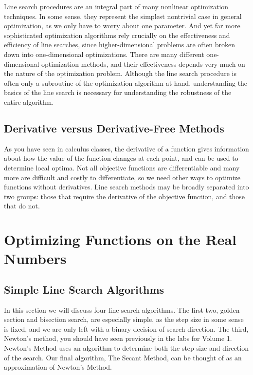 Line search procedures are an integral part of many nonlinear optimization techniques.
In some sense, they represent the simplest nontrivial case in general optimization, as
we only have to worry about one parameter. And yet far more sophisticated optimization
algorithms rely crucially on the effectiveness and efficiency of line searches, since
higher-dimensional problems are often broken down into one-dimensional optimizations.
There are many different one-dimensional optimization methods, and their effectiveness depends very much
on the nature of the optimization problem. Although the line search procedure is often
only a subroutine of the optimization algorithm at hand, understanding the basics of
the line search is necessary for understanding the robustness of the entire algorithm.

\subsection*{Derivative versus Derivative-Free Methods}
As you have seen in calculus classes, the derivative of a function gives information
about how the value of the function changes at each point, and can be used to determine
local optima. Not all objective functions are differentiable and many more are
difficult and costly to differentiate, so we need other ways to optimize functions
without derivatives. Line search methods may be broadly separated into two groups:
those that require the derivative of the objective function, and those that do not.

\section*{Optimizing Functions on the Real Numbers}

\subsection*{Simple Line Search Algorithms}
In this section we will discuss four line search algorithms. The first two, golden section
and bisection search, are especially simple, as the step size in some sense is fixed,
and we are only left with a binary decision of search direction. The third, Newton's method,
you should have seen previously in the labs for Volume 1. Newton's Method uses an algorithm
to determine both the step size and direction of the search. Our final algorithm, The Secant Method,
can be thought of as an approximation of Newton's Method.

